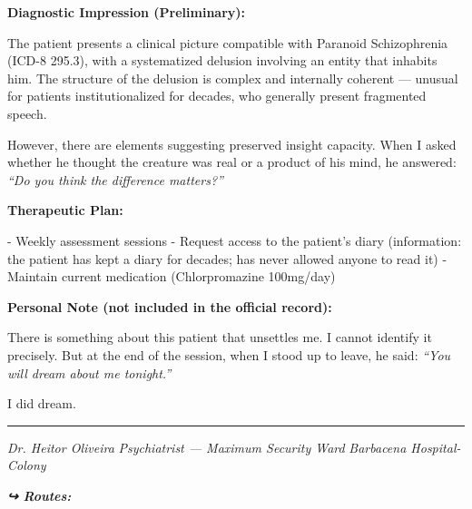 \noindent \textbf{Diagnostic Impression (Preliminary):}

\noindent The patient presents a clinical picture compatible with Paranoid Schizophrenia (ICD-8 295.3), with a systematized delusion involving an entity that inhabits him. The structure of the delusion is complex and internally coherent --- unusual for patients institutionalized for decades, who generally present fragmented speech.

\noindent However, there are elements suggesting preserved insight capacity. When I asked whether he thought the creature was real or a product of his mind, he answered: \textit{\textquotedblleft{}Do you think the difference matters?\textquotedblright{}}

\noindent \textbf{Therapeutic Plan:}

\noindent - Weekly assessment sessions
- Request access to the patient's diary (information: the patient has kept a diary for decades; has never allowed anyone to read it)
- Maintain current medication (Chlorpromazine 100mg/day)

\noindent \textbf{Personal Note (not included in the official record):}

\noindent There is something about this patient that unsettles me. I cannot identify it precisely. But at the end of the session, when I stood up to leave, he said: \textit{\textquotedblleft{}You will dream about me tonight.\textquotedblright{}}

\noindent I did dream.

\vspace{0.5em}\noindent\rule{\textwidth}{0.5pt}\vspace{0.5em}

\noindent \textit{Dr. Heitor Oliveira}
\textit{Psychiatrist --- Maximum Security Ward}
\textit{Barbacena Hospital-Colony}

\vspace{0.5em}
\noindent\textit{\textbf{↪ Routes:}  \rotasep {} \rotasep {} \rotasep {}}
